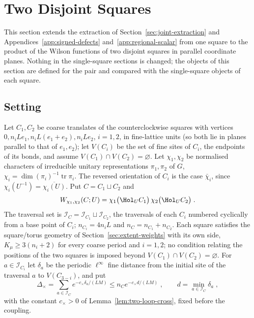 
\section{Two Disjoint Squares}\label{sec:two-loops}

This section extends the extraction of Section~\ref{sec:joint-extraction} and Appendices~\ref{app:signed-defects} and~\ref{app:regional-scalar} from one square to the product of the Wilson functions of two disjoint squares in parallel coordinate planes. Nothing in the single-square sections is changed; the objects of this section are defined for the pair and compared with the single-square objects of each square.

\subsection{Setting}\label{sec:two-loops-setting}
Let $C_1,C_2$ be coarse translates of the counterclockwise squares with vertices $0,n_iLe_1,n_iL(e_1+e_2),n_iLe_2$, $i=1,2$, in fine-lattice units (so both lie in planes parallel to that of $e_1,e_2$); let $V(C_i)$ be the set of fine sites of $C_i$, the endpoints of its bonds, and assume $V(C_1)\cap V(C_2)=\varnothing$. Let $\chi_1,\chi_2$ be normalised characters of irreducible unitary representations $\pi_1,\pi_2$ of $G$, $\chi_i=\dim(\pi_i)^{-1}\operatorname{tr}\pi_i$. The reversed orientation of $C_i$ is the case $\bar\chi_i$, since $\chi_i(U^{-1})=\overline{\chi_i(U)}$. Put $C=C_1\sqcup C_2$ and
\begin{equation}\label{eq:two-loop-observable}
    W_{\chi_1,\chi_2}(C;U)=\chi_1\bigl(\Hol_UC_1\bigr)\,\chi_2\bigl(\Hol_UC_2\bigr)\;.
\end{equation}
The traversal set is $\mathcal I_C=\mathcal I_{C_1}\sqcup\mathcal I_{C_2}$, the traversals of each $C_i$ numbered cyclically from a base point of $C_i$; $n_{C_i}=4n_iL$ and $n_C=n_{C_1}+n_{C_2}$. Each square satisfies the square/torus geometry of Section~\ref{sec:extent-weights} with its own side, $K_\mu\geq3(n_i+2)$ for every coarse period and $i=1,2$; no condition relating the positions of the two squares is imposed beyond $V(C_1)\cap V(C_2)=\varnothing$. For $a\in\mathcal I_{C_i}$ let $\delta_a$ be the periodic $\ell^\infty$ fine distance from the initial site of the traversal $a$ to $V(C_{3-i})$, and put
\begin{equation}\label{eq:two-loop-cross-sum}
    \Delta_\times=\sum_{a\in\mathcal I_C}e^{-c_\times\delta_a/(LM)}\leq n_Ce^{-c_\times d/(LM)}\;,\qquad d=\min_{a\in\mathcal I_C}\delta_a\;,
\end{equation}
with the constant $c_\times>0$ of Lemma~\ref{lem:two-loop-cross}, fixed before the coupling.


